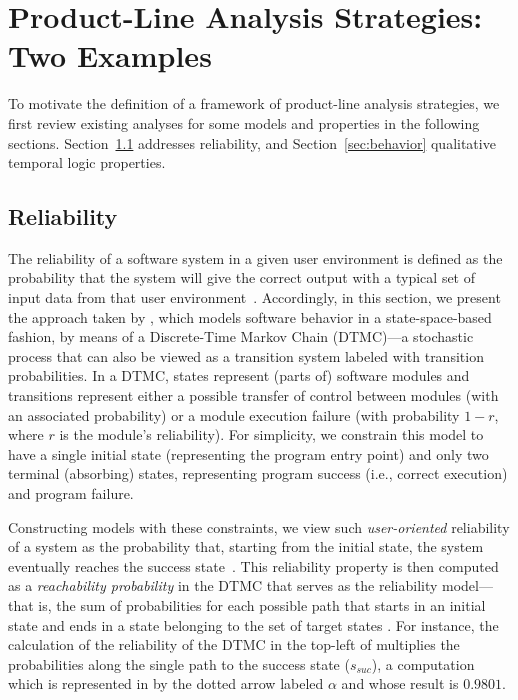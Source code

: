 \section{Product-Line Analysis Strategies: Two Examples}
\label{sec:strategies}

To motivate the definition of a framework of product-line analysis strategies, we first review existing analyses for some models and properties in the following sections. Section~\ref{sec:reliability} addresses reliability, and Section~\ref{sec:behavior} qualitative temporal logic properties.


\subsection{Reliability}
\label{sec:reliability}

The reliability of a software system in a given user environment is defined as the probability that the system will give the
correct output with a typical set of input data from that user
environment~\cite{user-oriented-reliability}.
Accordingly, in this section, we present the approach taken by \citet{Castro2017}, which models software behavior in a state-space-based fashion, by
means of a Discrete-Time Markov Chain (DTMC)---a stochastic process that
can also be viewed as a transition system labeled with transition probabilities.
In a DTMC, states represent (parts of) software modules and transitions
represent either a possible transfer of control between modules (with an
associated probability) or a module execution failure (with probability $1-r$,
where $r$ is the module's reliability).
For simplicity, we constrain this model to have a single initial state
(representing the program entry point) and only two terminal (absorbing)
states, representing program success (i.e., correct execution) and program
failure.

Constructing models with these constraints, we view such \emph{user-oriented}
reliability of a system as the probability that, starting from the initial
state, the system eventually reaches the success
state~\cite{user-oriented-reliability}.
This reliability property is then computed as a \emph{reachability
probability} in the DTMC that serves as the reliability model---that is, the sum of probabilities for each possible path that starts in an initial state  and ends in a state belonging to the set of target states \cite{baier_principles_2008}.
For instance, the calculation of the reliability of the DTMC in the top-left of  multiplies the probabilities along the single path to the success state ($s_{\mathit{suc}}$), a computation which is represented in  by the dotted arrow labeled $\alpha$ and whose result is $0.9801$.
 
